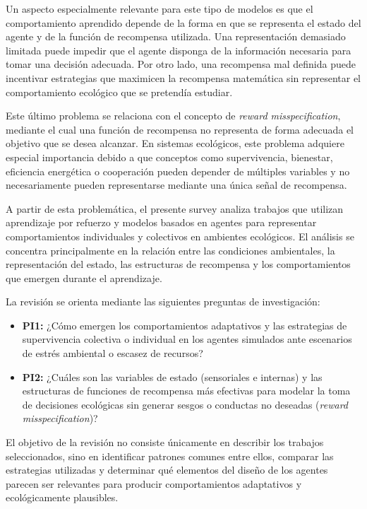 \documentclass[conference]{IEEEtran}
\begin{document}
Un aspecto especialmente relevante para este tipo de modelos es que el
comportamiento aprendido depende de la forma en que se representa el
estado del agente y de la función de recompensa utilizada. Una
representación demasiado limitada puede impedir que el agente disponga
de la información necesaria para tomar una decisión adecuada. Por otro
lado, una recompensa mal definida puede incentivar estrategias que
maximicen la recompensa matemática sin representar el comportamiento
ecológico que se pretendía estudiar.

Este último problema se relaciona con el concepto de
\textit{reward misspecification}, mediante el cual una función de
recompensa no representa de forma adecuada el objetivo que se desea
alcanzar. En sistemas ecológicos, este problema adquiere especial
importancia debido a que conceptos como supervivencia, bienestar,
eficiencia energética o cooperación pueden depender de múltiples
variables y no necesariamente pueden representarse mediante una única
señal de recompensa.

A partir de esta problemática, el presente survey analiza trabajos que
utilizan aprendizaje por refuerzo y modelos basados en agentes para
representar comportamientos individuales y colectivos en ambientes
ecológicos. El análisis se concentra principalmente en la relación entre
las condiciones ambientales, la representación del estado, las
estructuras de recompensa y los comportamientos que emergen durante el
aprendizaje.

La revisión se orienta mediante las siguientes preguntas de
investigación:

\begin{itemize}

    \item \textbf{PI1:} ¿Cómo emergen los comportamientos adaptativos y
    las estrategias de supervivencia colectiva o individual en los
    agentes simulados ante escenarios de estrés ambiental o escasez de
    recursos?

    \item \textbf{PI2:} ¿Cuáles son las variables de estado
    (sensoriales e internas) y las estructuras de funciones de recompensa
    más efectivas para modelar la toma de decisiones ecológicas sin
    generar sesgos o conductas no deseadas
    (\textit{reward misspecification})?

\end{itemize}

El objetivo de la revisión no consiste únicamente en describir los
trabajos seleccionados, sino en identificar patrones comunes entre ellos,
comparar las estrategias utilizadas y determinar qué elementos del diseño
de los agentes parecen ser relevantes para producir comportamientos
adaptativos y ecológicamente plausibles.
\end{document}
